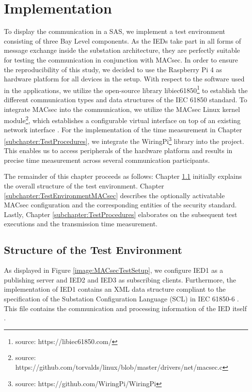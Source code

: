\documentclass[conference, onecolumn, a4paper]{IEEEtran}
\begin{document}
\section{Implementation}
\label{chapter:implementation}
\noindent To display the communication in a SAS, we implement a test environment consisting of three Bay Level components. As the IEDs take part 
in all forms of message exchange inside the substation architecture, they are perfectly suitable for testing the communication in conjunction with MACsec. 
In order to ensure the reproducibility of this study, we decided to use the Raspberry Pi 4 as hardware platform for all devices in the setup. With respect 
to the software used in the applications, we utilize the open-source library libiec61850\footnote{source: https://libiec61850.com/} to establish the 
different communication types and data structures of the IEC 61850 standard. To integrate MACsec into the communication, we utilize the MACsec Linux kernel 
module\footnote{source: https://github.com/torvalds/linux/blob/master/drivers/net/macsec.c}, which establishes a configurable virtual interface on top of 
an existing network interface \cite{MACsecLinuxModuleDoc:2016}. For the implementation of the time measurement in Chapter \ref{subchapter:TestProcedures},  
we integrate the WiringPi\footnote{source: https://github.com/WiringPi/WiringPi} library into the project. This enables us to access peripherals of the 
hardware platform and results in precise time measurement across several communication participants. 

\smallskip 
The remainder of this chapter proceeds as follows: Chapter \ref{subchapter:TestEnvironmentStructure} initially explains the overall structure of the 
test environment. Chapter \ref{subchapter:TestEnvironmentMACsec} describes the optionally activatable MACsec configuration and the corresponding entities 
of the security standard. Lastly, Chapter \ref{subchapter:TestProcedures} elaborates on the subsequent test executions and the transmission time measurement. 

\subsection{Structure of the Test Environment}
\label{subchapter:TestEnvironmentStructure}
\noindent As displayed in Figure \ref{image:MACsecTestSetup}, we configure IED1 as a publishing server and IED2 and IED3 as subscribing clients. 
Furthermore, the implementation of IED1 contains an XML data structure compliant to the specification of the Substation Configuration Language (SCL) 
in IEC 61850-6 \cite{IEC61850-6:2010}. This file contains the communication and processing information of the IED itself \cite{IEC61850_Overview:2006}.
\end{document}
